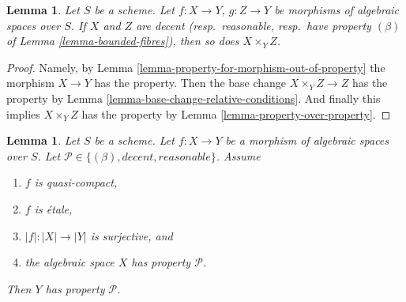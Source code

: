 \documentclass{stacks-project}
\theoremstyle{plain}
\newtheorem{lemma}[subsection]{Lemma}
\theoremstyle{definition}
\theoremstyle{remark}
\numberwithin{equation}{subsection}
\begin{document}
\begin{lemma}
\label{lemma-fibre-product-conditions}
Let $S$ be a scheme. Let $f : X \to Y$, $g : Z \to Y$ be morphisms
of algebraic spaces over $S$. If $X$ and $Z$ are decent
(resp.\ reasonable, resp.\ have property 
$(\beta)$ of Lemma \ref{lemma-bounded-fibres}), then so does $X \times_Y Z$.
\end{lemma}

\begin{proof}
Namely, by Lemma \ref{lemma-property-for-morphism-out-of-property}
the morphism $X \to Y$ has the property. Then the base change
$X \times_Y Z \to Z$ has the property by
Lemma \ref{lemma-base-change-relative-conditions}.
And finally this implies $X \times_Y Z$ has the
property by Lemma \ref{lemma-property-over-property}.
\end{proof}

\begin{lemma}
\label{lemma-descent-conditions}
Let $S$ be a scheme.
Let $f : X \to Y$ be a morphism of algebraic spaces over $S$.
Let $\mathcal{P} \in \{(\beta), decent, reasonable\}$.
Assume
\begin{enumerate}
\item $f$ is quasi-compact,
\item $f$ is \'etale,
\item $|f| : |X| \to |Y|$ is surjective, and
\item the algebraic space $X$ has property $\mathcal{P}$.
\end{enumerate}
Then $Y$ has property $\mathcal{P}$.
\end{lemma}
\end{document}
